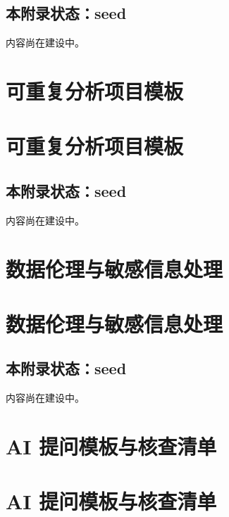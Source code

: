 \documentclass[
  letterpaper,
]{scrbook}
\begin{document}
\section{本附录状态：seed}\label{ux672cux9644ux5f55ux72b6ux6001seed-1}

内容尚在建设中。

\chapter{可重复分析项目模板}\label{ux53efux91cdux590dux5206ux6790ux9879ux76eeux6a21ux677f}

\chapter{可重复分析项目模板}\label{ux53efux91cdux590dux5206ux6790ux9879ux76eeux6a21ux677f-1}

\section{本附录状态：seed}\label{ux672cux9644ux5f55ux72b6ux6001seed-2}

内容尚在建设中。

\chapter{数据伦理与敏感信息处理}\label{ux6570ux636eux4f26ux7406ux4e0eux654fux611fux4fe1ux606fux5904ux7406}

\chapter{数据伦理与敏感信息处理}\label{ux6570ux636eux4f26ux7406ux4e0eux654fux611fux4fe1ux606fux5904ux7406-1}

\section{本附录状态：seed}\label{ux672cux9644ux5f55ux72b6ux6001seed-3}

内容尚在建设中。

\chapter{AI
提问模板与核查清单}\label{ai-ux63d0ux95eeux6a21ux677fux4e0eux6838ux67e5ux6e05ux5355}

\chapter{AI
提问模板与核查清单}\label{ai-ux63d0ux95eeux6a21ux677fux4e0eux6838ux67e5ux6e05ux5355-1}
\end{document}
